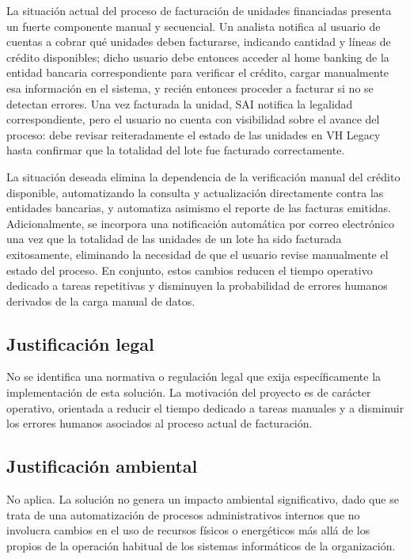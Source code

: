 La situación actual del proceso de facturación de unidades financiadas presenta un fuerte componente manual y secuencial. Un analista notifica al usuario de cuentas a cobrar qué unidades deben facturarse, indicando cantidad y líneas de crédito disponibles; dicho usuario debe entonces acceder al home banking de la entidad bancaria correspondiente para verificar el crédito, cargar manualmente esa información en el sistema, y recién entonces proceder a facturar si no se detectan errores. Una vez facturada la unidad, SAI notifica la legalidad correspondiente, pero el usuario no cuenta con visibilidad sobre el avance del proceso: debe revisar reiteradamente el estado de las unidades en VH Legacy hasta confirmar que la totalidad del lote fue facturado correctamente.

La situación deseada elimina la dependencia de la verificación manual del crédito disponible, automatizando la consulta y actualización directamente contra las entidades bancarias, y automatiza asimismo el reporte de las facturas emitidas. Adicionalmente, se incorpora una notificación automática por correo electrónico una vez que la totalidad de las unidades de un lote ha sido facturada exitosamente, eliminando la necesidad de que el usuario revise manualmente el estado del proceso. En conjunto, estos cambios reducen el tiempo operativo dedicado a tareas repetitivas y disminuyen la probabilidad de errores humanos derivados de la carga manual de datos.

\subsection{Justificación legal}

No se identifica una normativa o regulación legal que exija específicamente la implementación de esta solución. La motivación del proyecto es de carácter operativo, orientada a reducir el tiempo dedicado a tareas manuales y a disminuir los errores humanos asociados al proceso actual de facturación.

\subsection{Justificación ambiental}

No aplica. La solución no genera un impacto ambiental significativo, dado que se trata de una automatización de procesos administrativos internos que no involucra cambios en el uso de recursos físicos o energéticos más allá de los propios de la operación habitual de los sistemas informáticos de la organización.

